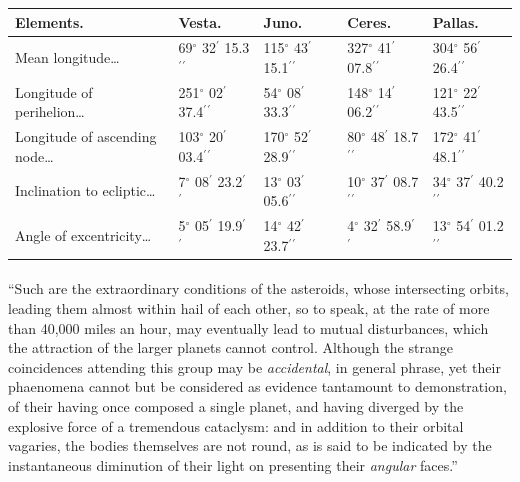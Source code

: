 \documentclass[a4paper, 12pt, oneside]{article}
\begin{document}
\begin{table}[!ht]
    \centering
    \footnotesize
    \Fontauri
    \begin{tabular}{|p{20mm}|l|l|l|l|}
    \hline
         Elements. & Vesta. & Juno. & Ceres. & Pallas. \\ \hline
        Mean longitude… & 69$^\circ$ 32$^\prime$ 15.3$^\prime$$^\prime$ & 115$^\circ$ 43$^\prime$ 15.1$^\prime$$^\prime$ & 327$^\circ$ 41$^\prime$ 07.8$^\prime$$^\prime$ & 304$^\circ$ 56$^\prime$ 26.4$^\prime$$^\prime$ \\ \hline
        Longitude of perihelion… & 251$^\circ$ 02$^\prime$ 37.4$^\prime$$^\prime$ & 54$^\circ$ 08$^\prime$ 33.3$^\prime$$^\prime$ & 148$^\circ$ 14$^\prime$ 06.2$^\prime$$^\prime$ & 121$^\circ$ 22$^\prime$ 43.5$^\prime$$^\prime$ \\ \hline
        Longitude of ascending node… & 103$^\circ$ 20$^\prime$ 03.4$^\prime$$^\prime$ & 170$^\circ$ 52$^\prime$ 28.9$^\prime$$^\prime$ & 80$^\circ$ 48$^\prime$ 18.7$^\prime$$^\prime$ & 172$^\circ$ 41$^\prime$ 48.1$^\prime$$^\prime$ \\ \hline
        Inclination to ecliptic… & 7$^\circ$ 08$^\prime$ 23.2$^\prime$$^\prime$ & 13$^\circ$ 03$^\prime$ 05.6$^\prime$$^\prime$ & 10$^\circ$ 37$^\prime$ 08.7$^\prime$$^\prime$ & 34$^\circ$ 37$^\prime$ 40.2$^\prime$$^\prime$ \\ \hline
        Angle of excentricity… & 5$^\circ$ 05$^\prime$ 19.9$^\prime$$^\prime$ & 14$^\circ$ 42$^\prime$ 23.7$^\prime$$^\prime$ & 4$^\circ$ 32$^\prime$ 58.9$^\prime$$^\prime$ & 13$^\circ$ 54$^\prime$ 01.2$^\prime$$^\prime$ \\ \hline
    \end{tabular}
\end{table}
\paragraph{}
``Such are the extraordinary conditions of the asteroids, whose intersecting orbits, leading them almost within hail of each other, so to speak, at the rate of more than 40,000 miles an hour, may eventually lead to mutual disturbances, which the attraction of the larger planets cannot control. Although the strange coincidences attending this group may be \emph{accidental}, in general phrase, yet their phaenomena cannot but be considered as evidence tantamount to demonstration, of their having once composed a single planet, and having diverged by the explosive force of a tremendous cataclysm: and in addition to their orbital vagaries, the bodies themselves are not round, as is said to be indicated by the instantaneous diminution of their light on presenting their \emph{angular} faces.''
\end{document}
